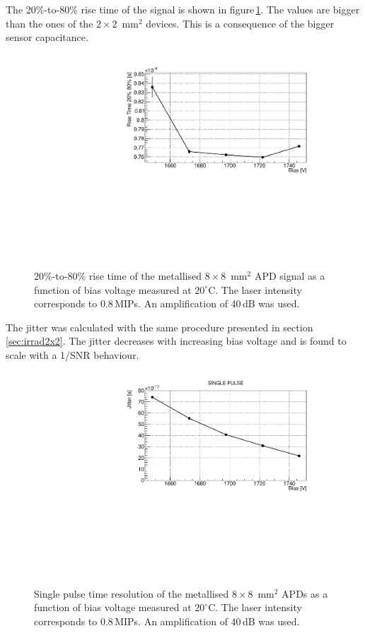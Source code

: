 \documentclass[3p,preprint,twocolumn]{elsarticle}
\begin{document}
The 20\%-to-80\% rise time of the signal is shown in figure\,\ref{fig:riseTime8x8metal}.
The values are bigger than the ones of the $2 \times 2$~mm$^2$ devices.
This is a consequence of the bigger sensor capacitance.

\begin{figure}
  \centering
  \includegraphics[width = \columnwidth]{riseTime8x8metal}
  \caption{20\%-to-80\% rise time of the metallised $8 \times 8$~mm$^2$ APD signal as a function of bias voltage measured at $20^\circ$C. The laser intensity corresponds to 0.8\,MIPs. An amplification of 40\,dB was used.}
  \label{fig:riseTime8x8metal}
\end{figure}

The jitter was calculated with the same procedure presented in section\,\ref{sec:irrad2x2}.
The jitter decreases with increasing bias voltage and is found to scale with a 1/SNR behaviour.

\begin{figure}
  \centering
  \includegraphics[width = \columnwidth]{timeRes8x8metal}
  \caption{Single pulse time resolution of the metallised $8 \times 8$~mm$^2$ APDs as a function of bias voltage measured at $20^\circ$C. The laser intensity corresponds to 0.8\,MIPs. An amplification of 40\,dB was used.}
  \label{fig:timeRes8x8metal}
\end{figure}
\end{document}
